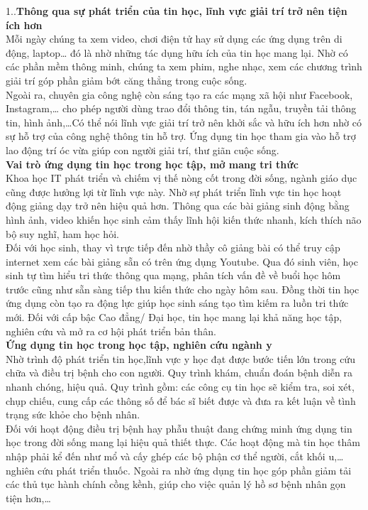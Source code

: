 \documentclass[12pt,a4paper]{report}
\begin{document}
     1..\textbf{Thông qua sự phát triển của tin học, lĩnh vực giải trí trở nên tiện ích hơn} \\Mỗi ngày chúng ta xem video, chơi điện tử hay sử dụng các ứng dụng trên di động, laptop… đó là nhờ những tác dụng hữu ích của tin học mang lại. Nhờ có các phần mềm thông minh, chúng ta xem phim, nghe nhạc, xem các chương trình giải trí góp phần giảm bớt căng thẳng trong cuộc sống.\\Ngoài ra, chuyên gia công nghệ còn sáng tạo ra các mạng xã hội như Facebook, Instagram,… cho phép người dùng trao đổi thông tin, tán ngẫu, truyền tải thông tin, hình ảnh,…Có thể nói lĩnh vực giải trí trở nên khởi sắc và hữu ích hơn nhờ có sự hỗ trợ của công nghệ thông tin hỗ trợ. Ứng dụng tin học tham gia vào hỗ trợ lao động trí óc vừa giúp con người giải trí, thư giãn cuộc sống.\\
     \textbf{Vai trò ứng dụng tin học trong học tập, mở mang tri thức}\\
     Khoa học IT phát triển và chiếm vị thế nòng cốt trong đời sống, ngành giáo dục cũng được hưởng lợi từ lĩnh vực này. Nhờ sự phát triển lĩnh vực tin học hoạt động giảng dạy trở nên hiệu quả hơn. Thông qua các bài giảng sinh động bằng hình ảnh, video khiến học sinh cảm thấy lĩnh hội kiến thức nhanh, kích thích não bộ suy nghĩ, ham học hỏi.\\Đối với học sinh, thay vì trực tiếp đến nhờ thầy cô giảng bài có thể truy cập internet xem các bài giảng sẵn có trên ứng dụng Youtube. Qua đó sinh viên, học sinh tự tìm hiểu tri thức thông qua mạng, phân tích vấn đề về buổi học hôm trước cũng như sẵn sàng tiếp thu kiến thức cho ngày hôm sau. Đồng thời tin học ứng dụng còn tạo ra động lực giúp học sinh sáng tạo tìm kiếm ra luồn tri thức mới. Đối với cấp bậc Cao đẳng/ Đại học, tin học mang lại khả năng học tập, nghiên cứu và mở ra cơ hội phát triển bản thân.\\
     \textbf{Ứng dụng tin học trong học tập, nghiên cứu ngành y}\\
     Nhờ trình độ phát triển tin học,lĩnh vực y học đạt được bước tiến lớn trong cứu chữa và điều trị bệnh cho con người. Quy trình khám, chuẩn đoán bệnh diễn ra nhanh chóng, hiệu quả. Quy trình gồm: các công cụ tin học sẽ kiểm tra, soi xét, chụp chiếu, cung cấp các thông số để bác sĩ biết được và đưa ra kết luận về tình trạng sức khỏe cho bệnh nhân.\\Đối với hoạt động điều trị bệnh hay phẫu thuật đang chứng minh ứng dụng tin học trong đời sống mang lại hiệu quả thiết thực. Các hoạt động mà tin học thâm nhập phải kể đến như mổ và cấy ghép các bộ phận cơ thể người, cắt khối u,… nghiên cứu phát triển thuốc. Ngoài ra nhờ ứng dụng tin học góp phần giảm tải các thủ tục hành chính cồng kềnh, giúp cho việc quản lý hồ sơ bệnh nhân gọn tiện hơn,…\\
\end{document}
